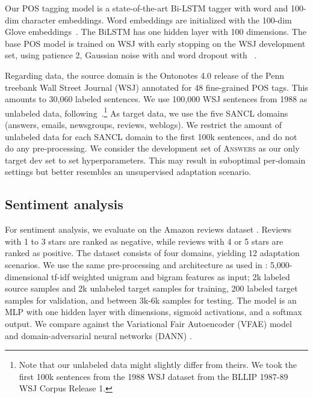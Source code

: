\documentclass[11pt,a4paper]{article}
\begin{document}
Our POS tagging model is a state-of-the-art Bi-LSTM tagger \cite{Plank2016} with word and 100-dim character embeddings. Word embeddings are initialized with the 100-dim Glove embeddings~\cite{pennington2014glove}. The BiLSTM has one hidden layer with 100 dimensions. The base POS model is trained on WSJ with early stopping on the WSJ development set, using patience 2, Gaussian noise with  and word dropout with ~\cite{TACL885}. 


Regarding data, the source domain is the Ontonotes 4.0 release of the Penn treebank Wall Street Journal (WSJ) annotated for 48 fine-grained POS tags. This amounts to 30,060 labeled sentences. We use 100,000 WSJ sentences from 1988 as unlabeled data, following~.\footnote{Note that our unlabeled data might slightly differ from theirs. We took the first 100k sentences from the 1988 WSJ dataset from the BLLIP 1987-89 WSJ Corpus Release 1.}  As target data, we use the five SANCL domains (answers, emails, newsgroups, reviews, weblogs). We restrict the amount of unlabeled data for each SANCL domain to the first 100k sentences, and 
do not do any pre-processing. We consider the development set of \textsc{Answers} as our only target dev set to set hyperparameters. This may result in suboptimal per-domain settings but better resembles an unsupervised adaptation scenario. 

\subsection{Sentiment analysis} For sentiment analysis, we evaluate on the Amazon reviews dataset \cite{Blitzer2006}. Reviews with 1 to 3 stars are ranked as negative, while reviews with 4 or 5 stars are ranked as positive. The dataset consists of four domains, yielding 12 adaptation scenarios. We use the same pre-processing and architecture as used in \cite{Ganin2016,Saito2017}: 5,000-dimensional tf-idf weighted unigram and bigram features as input; 2k labeled source samples and 2k unlabeled target samples for training, 200 labeled target samples for validation, and between 3k-6k samples for testing. The model is an MLP with one hidden layer with  dimensions, sigmoid activations, and a softmax output. We compare against the
Variational Fair Autoencoder (VFAE) \cite{louizos2015variational} model and domain-adversarial neural networks (DANN) \cite{Ganin2016}.
\end{document}
